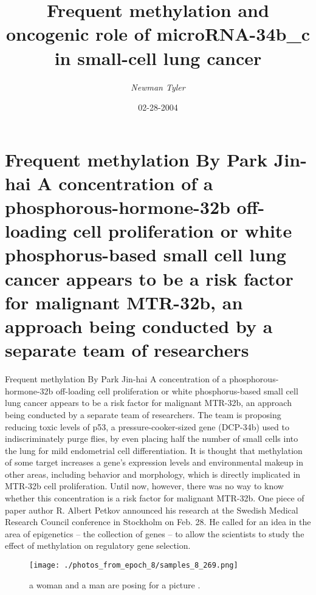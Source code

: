 \documentclass{article}%
\title{Frequent methylation and oncogenic role of microRNA{-}34b\_c in small{-}cell lung cancer}%
\author{\textit{Newman Tyler}}%
\date{02-28-2004}%
\begin{document}
%
\normalsize%
\maketitle%
\section{Frequent methylation\newline%
By Park Jin{-}hai\newline%
A concentration of a phosphorous{-}hormone{-}32b off{-}loading cell proliferation or white phosphorus{-}based small cell lung cancer appears to be a risk factor for malignant MTR{-}32b, an approach being conducted by a separate team of researchers}%
\label{sec:FrequentmethylationByParkJin{-}haiAconcentrationofaphosphorous{-}hormone{-}32boff{-}loadingcellproliferationorwhitephosphorus{-}basedsmallcelllungcancerappearstobeariskfactorformalignantMTR{-}32b,anapproachbeingconductedbyaseparateteamofresearchers}%
Frequent methylation\newline%
By Park Jin{-}hai\newline%
A concentration of a phosphorous{-}hormone{-}32b off{-}loading cell proliferation or white phosphorus{-}based small cell lung cancer appears to be a risk factor for malignant MTR{-}32b, an approach being conducted by a separate team of researchers.\newline%
The team is proposing reducing toxic levels of p53, a pressure{-}cooker{-}sized gene (DCP{-}34b) used to indiscriminately purge flies, by even placing half the number of small cells into the lung for mild endometrial cell differentiation.\newline%
It is thought that methylation of some target increases a gene's expression levels and environmental makeup in other areas, including behavior and morphology, which is directly implicated in MTR{-}32b cell proliferation.\newline%
Until now, however, there was no way to know whether this concentration is a risk factor for malignant MTR{-}32b.\newline%
One piece of paper author R. Albert Petkov announced his research at the Swedish Medical Research Council conference in Stockholm on Feb. 28.\newline%
He called for an idea in the area of epigenetics – the collection of genes – to allow the scientists to study the effect of methylation on regulatory gene selection.\newline%

%


\begin{figure}[h!]%
\centering%
\texttt{[image: ./photos\_from\_epoch\_8/samples\_8\_269.png]}%
\caption{a woman and a man are posing for a picture .}%
\end{figure}

%
\end{document}
